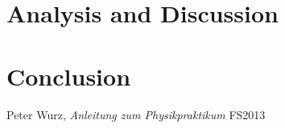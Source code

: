 \documentclass{scrreprt}
\begin{document}
\section{Analysis and Discussion}

\section{Conclusion}

\begin{thebibliography}{9}

  Peter Wurz,
  \emph{Anleitung zum Physikpraktikum}
  FS2013

\end{thebibliography}
\end{document}
